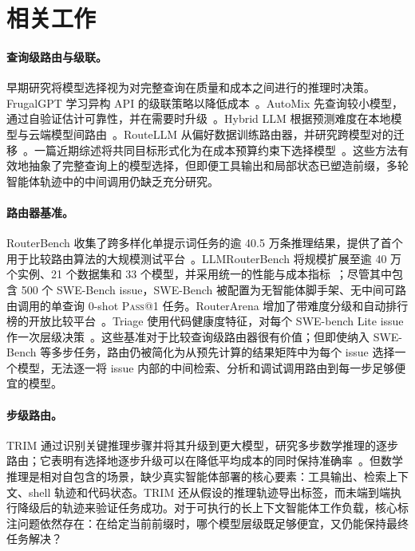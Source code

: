 \section{相关工作}
\label{sec:related}

\paragraph{查询级路由与级联。}
早期研究将模型选择视为对完整查询在质量和成本之间进行的推理时决策。FrugalGPT 学习异构 API 的级联策略以降低成本~\citep{chen2024frugalgpt}。AutoMix 先查询较小模型，通过自验证估计可靠性，并在需要时升级~\citep{aggarwal2023automix}。Hybrid LLM 根据预测难度在本地模型与云端模型间路由~\citep{ding2024hybrid}。RouteLLM 从偏好数据训练路由器，并研究跨模型对的迁移~\citep{ong2024routellm}。一篇近期综述将共同目标形式化为在成本预算约束下选择模型~\citep{varangotreille2025doing}。这些方法有效地抽象了完整查询上的模型选择，但即便工具输出和局部状态已塑造前缀，多轮智能体轨迹中的中间调用仍缺乏充分研究。

\paragraph{路由器基准。}
RouterBench 收集了跨多样化单提示词任务的逾 40.5 万条推理结果，提供了首个用于比较路由算法的大规模测试平台~\citep{hu2024routerbench}。LLMRouterBench 将规模扩展至逾 40 万个实例、21 个数据集和 33 个模型，并采用统一的性能与成本指标~\citep{li2026llmrouterbench}；尽管其中包含 500 个 SWE-Bench issue，SWE-Bench 被配置为无智能体脚手架、无中间可路由调用的单查询 $0$-shot \textsc{Pass@1} 任务。RouterArena 增加了带难度分级和自动排行榜的开放比较平台~\citep{lu2025routerarena}。Triage 使用代码健康度特征，对每个 SWE-bench Lite issue 作一次层级决策~\citep{madeyski2026triage}。这些基准对于比较查询级路由器很有价值；但即使纳入 SWE-Bench 等多步任务，路由仍被简化为从预先计算的结果矩阵中为每个 issue 选择一个模型，无法逐一将 issue 内部的中间检索、分析和调试调用路由到每一步足够便宜的模型。

\paragraph{步级路由。}
TRIM 通过识别关键推理步骤并将其升级到更大模型，研究多步数学推理的逐步路由；它表明有选择地逐步升级可以在降低平均成本的同时保持准确率~\citep{kapoor2026trim}。但数学推理是相对自包含的场景，缺少真实智能体部署的核心要素：工具输出、检索上下文、shell 轨迹和代码状态。TRIM 还从假设的推理轨迹导出标签，而未端到端执行降级后的轨迹来验证任务成功。对于可执行的长上下文智能体工作负载，核心标注问题依然存在：在给定当前前缀时，哪个模型层级既足够便宜，又仍能保持最终任务解决？
